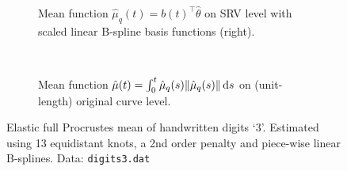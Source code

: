 \begin{figure}
  \centering
  \begin{subfigure}{\textwidth}
    \begin{subfigure}{.48\textwidth}
      \centering
    \end{subfigure}\hfill%
    \begin{subfigure}{.48\textwidth}
      \centering
      \begin{subfigure}{\textwidth}
        \centering
      \end{subfigure}
      \begin{subfigure}{\textwidth}
        \centering
      \end{subfigure}
    \end{subfigure}
    \caption{Mean function $\hat\mu_q(t) = b(t)^\top \hat\theta$ on SRV level with scaled linear B-spline basis functions (right).}
  \end{subfigure}\vspace{0.66em}\\
  \begin{subfigure}{\textwidth}
    \centering
    \begin{subfigure}{.48\textwidth}
      \centering
    \end{subfigure}\hfill%
    \begin{subfigure}{.48\textwidth}
      \centering
      \begin{subfigure}{\textwidth}
        \centering
      \end{subfigure}
      \begin{subfigure}{\textwidth}
        \centering
      \end{subfigure}
    \end{subfigure}
    \caption{Mean function $\hat\mu(t) = \int_0^t \hat\mu_q(s) \lVert\hat\mu_q(s)\rVert \mathop{\mathrm{d}s}$ on (unit-length) original curve level.}
  \end{subfigure}
  \caption{Elastic full Procrustes mean of handwritten digits \enquote*{3}.
    Estimated using 13 equidistant knots, a 2nd order penalty and piece-wise linear B-splines.
    Data: \texttt{digits3.dat}}
  \label{fig:3-mean}
\end{figure}


